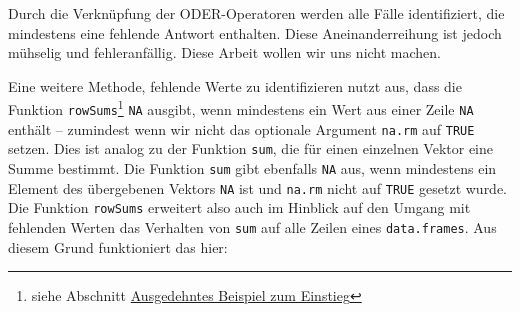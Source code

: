 \documentclass[12pt,]{tufte-book}
\newenvironment{Shaded}{\begin{snugshade}}{\end{snugshade}}
\newcommand{\KeywordTok}[1]{\textcolor[rgb]{0.13,0.29,0.53}{\textbf{#1}}}
\newcommand{\StringTok}[1]{\textcolor[rgb]{0.31,0.60,0.02}{#1}}
\newcommand{\OperatorTok}[1]{\textcolor[rgb]{0.81,0.36,0.00}{\textbf{#1}}}
\newcommand{\NormalTok}[1]{#1}
\theoremstyle{definition}
\theoremstyle{definition}
\theoremstyle{definition}
\theoremstyle{remark}
\begin{document}
\begin{Shaded}
\end{Shaded}

Durch die Verknüpfung der ODER-Operatoren werden alle Fälle
identifiziert, die mindestens eine fehlende Antwort enthalten. Diese
Aneinanderreihung ist jedoch mühselig und fehleranfällig. Diese Arbeit
wollen wir uns nicht machen.

Eine weitere Methode, fehlende Werte zu identifizieren nutzt aus, dass
die Funktion \texttt{rowSums}\footnote{siehe Abschnitt
  \protect\hyperlink{kap4einstieg}{Ausgedehntes Beispiel zum Einstieg}}
\texttt{NA} ausgibt, wenn mindestens ein Wert aus einer Zeile
\texttt{NA} enthält -- zumindest wenn wir nicht das optionale Argument
\texttt{na.rm} auf \texttt{TRUE} setzen. Dies ist analog zu der Funktion
\texttt{sum}, die für einen einzelnen Vektor eine Summe bestimmt. Die
Funktion \texttt{sum} gibt ebenfalls \texttt{NA} aus, wenn mindestens
ein Element des übergebenen Vektors \texttt{NA} ist und \texttt{na.rm}
nicht auf \texttt{TRUE} gesetzt wurde. Die Funktion \texttt{rowSums}
erweitert also auch im Hinblick auf den Umgang mit fehlenden Werten das
Verhalten von \texttt{sum} auf alle Zeilen eines \texttt{data.frames}.
Aus diesem Grund funktioniert das hier:
\end{document}
